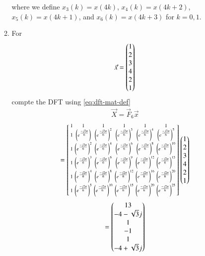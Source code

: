 \documentclass[journal,12pt,twocolumn]{IEEEtran}
\renewcommand\thesection{\arabic{section}}
\begin{document}
\begin{enumerate}[label=\thesection.\arabic*]
\begin{enumerate}[label=\arabic*.,ref=\thesection.\theenumi]
where we define $x_3(k) = x(4k)$, $x_4(k) = x(4k + 2)$, $x_5(k) = x(4k + 1)$, and $x_6(k) = x(4k + 3)$ for $k = 0, 1$.
	\item For 
	\begin{align}
		\vec{x} = \begin{pmatrix}1\\2\\3\\4\\2\\1\end{pmatrix}
		\label{eq:equation1}
	\end{align}
	compte the DFT  
	using 
	\eqref{eq:dft-mat-def} \\
	\solution
	\begin{align}
		\vec{X} = \vec{F}_6 \vec{x}
	\end{align}	
	\begin{align}
		= \begin{bsmallmatrix}
			1	&	1	&	1	&	1	&	1	&	1\\
			1	&	\left(e^{\frac{-j2\pi}{6}}\right)	&	\left(e^{\frac{-j2\pi}{6}}\right)^2	&	\left(e^{\frac{-j2\pi}{6}}\right)^3	&	\left(e^{\frac{-j2\pi}{6}}\right)^4	&	\left(e^{\frac{-j2\pi}{6}}\right)^5\\
			1	&	\left(e^{\frac{-j2\pi}{6}}\right)^2	&	\left(e^{\frac{-j2\pi}{6}}\right)^4	&	\left(e^{\frac{-j2\pi}{6}}\right)^6	&	\left(e^{\frac{-j2\pi}{6}}\right)^8	&	\left(e^{\frac{-j2\pi}{6}}\right)^{10}\\
			1	&	\left(e^{\frac{-j2\pi}{6}}\right)^3	&	\left(e^{\frac{-j2\pi}{6}}\right)^6	&	\left(e^{\frac{-j2\pi}{6}}\right)^9	&	\left(e^{\frac{-j2\pi}{6}}\right)^{12}	&	\left(e^{\frac{-j2\pi}{6}}\right)^{15}\\
			1	&	\left(e^{\frac{-j2\pi}{6}}\right)^4	&	\left(e^{\frac{-j2\pi}{6}}\right)^8	&	\left(e^{\frac{-j2\pi}{6}}\right)^{12}	&	\left(e^{\frac{-j2\pi}{6}}\right)^{16}	&	\left(e^{\frac{-j2\pi}{6}}\right)^{20}\\
			1	&	\left(e^{\frac{-j2\pi}{6}}\right)^5	&	\left(e^{\frac{-j2\pi}{6}}\right)^{10}	&	\left(e^{\frac{-j2\pi}{6}}\right)^{15}	&	\left(e^{\frac{-j2\pi}{6}}\right)^{20}	&	\left(e^{\frac{-j2\pi}{6}}\right)^{25}
		\end{bsmallmatrix}
		\begin{pmatrix}1\\2\\3\\4\\2\\1\end{pmatrix}
	\end{align}
	\begin{align}
		=\myvec{13\\-4 - \sqrt{3}j\\ 1\\-1\\1\\-4 + \sqrt{3}j}

\end{align}
\end{enumerate}
\end{enumerate}
\end{document}
